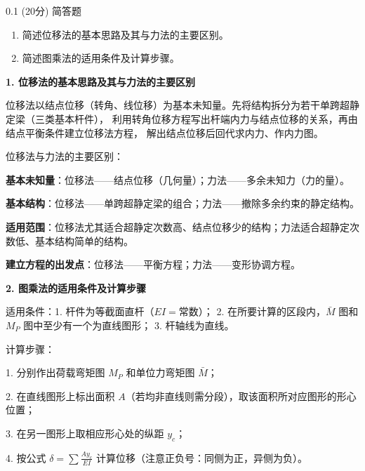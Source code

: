\begin{question}{0.1}
(20分) 简答题
\begin{enumerate}
\item 简述位移法的基本思路及其与力法的主要区别。
\item 简述图乘法的适用条件及计算步骤。
\end{enumerate}
\end{question}

\begin{solution}
\textbf{1. 位移法的基本思路及其与力法的主要区别}

位移法以结点位移（转角、线位移）为基本未知量。先将结构拆分为若干单跨超静定梁（三类基本杆件），
利用转角位移方程写出杆端内力与结点位移的关系，再由结点平衡条件建立位移法方程，
解出结点位移后回代求内力、作内力图。

位移法与力法的主要区别：

\textbf{基本未知量}：位移法——结点位移（几何量）；力法——多余未知力（力的量）。

\textbf{基本结构}：位移法——单跨超静定梁的组合；力法——撤除多余约束的静定结构。

\textbf{适用范围}：位移法尤其适合超静定次数高、结点位移少的结构；力法适合超静定次数低、基本结构简单的结构。

\textbf{建立方程的出发点}：位移法——平衡方程；力法——变形协调方程。

\textbf{2. 图乘法的适用条件及计算步骤}

适用条件：1. 杆件为等截面直杆（$EI = \text{常数}$）；
2. 在所要计算的区段内，$\bar{M}$ 图和 $M_P$ 图中至少有一个为直线图形；
3. 杆轴线为直线。

计算步骤：

1. 分别作出荷载弯矩图 $M_P$ 和单位力弯矩图 $\bar{M}$；

2. 在直线图形上标出面积 $A$（若均非直线则需分段），取该面积所对应图形的形心位置；

3. 在另一图形上取相应形心处的纵距 $y_c$；

4. 按公式 $\delta = \sum \frac{A y_c}{EI}$ 计算位移（注意正负号：同侧为正，异侧为负）。
\end{solution}
